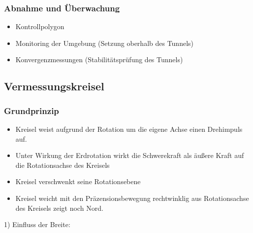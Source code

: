 \documentclass[12pt]{article}
\begin{document}
\subsubsection{Abnahme und Überwachung}
\begin{itemize}
	\item Kontrollpolygon
	\item Monitoring der Umgebung (Setzung oberhalb des Tunnels)
	\item Konvergenzmessungen (Stabilitätsprüfung des Tunnels)
\end{itemize}
\subsection{Vermessungskreisel}
\subsubsection{Grundprinzip}
\begin{itemize}
	\item Kreisel weist aufgrund der Rotation um die eigene Achse einen Drehimpuls auf. 
	\item Unter Wirkung der Erdrotation wirkt die Schwerekraft als äußere Kraft auf die Rotationsachse des Kreisels
	\item Kreisel verschwenkt seine Rotationsebene 
	\item Kreisel weicht mit den Präzensionsbewegung rechtwinklig aus Rotationsachse des Kreisels zeigt noch Nord.
\end{itemize}
1) Einfluss der Breite:
\begin{figure}[ht]\centering
\end{figure}
\end{document}
